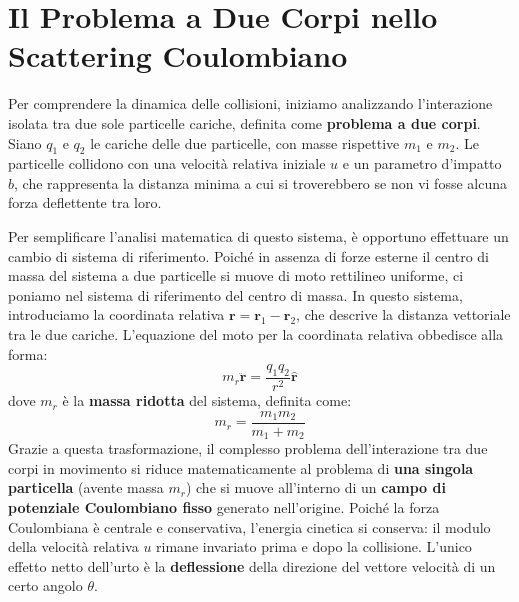 \section{Il Problema a Due Corpi nello Scattering Coulombiano}

Per comprendere la dinamica delle collisioni, iniziamo analizzando l'interazione isolata tra due sole particelle cariche, definita come \textbf{problema a due corpi}. Siano $q_1$ e $q_2$ le cariche delle due particelle, con masse rispettive $m_1$ e $m_2$. Le particelle collidono con una velocità relativa iniziale $u$ e un parametro d'impatto $b$, che rappresenta la distanza minima a cui si troverebbero se non vi fosse alcuna forza deflettente tra loro.

Per semplificare l'analisi matematica di questo sistema, è opportuno effettuare un cambio di sistema di riferimento. Poiché in assenza di forze esterne il centro di massa del sistema a due particelle si muove di moto rettilineo uniforme, ci poniamo nel sistema di riferimento del centro di massa. In questo sistema, introduciamo la coordinata relativa $\mathbf{r} = \mathbf{r}_1 - \mathbf{r}_2$, che descrive la distanza vettoriale tra le due cariche.
L'equazione del moto per la coordinata relativa obbedisce alla forma:
\begin{equation}
m_r \ddot{\mathbf{r}} = \frac{q_1 q_2}{r^2} \hat{\mathbf{r}}
\end{equation}
dove $m_r$ è la \textbf{massa ridotta} del sistema, definita come:
\begin{equation}
m_r = \frac{m_1 m_2}{m_1 + m_2}
\end{equation}
Grazie a questa trasformazione, il complesso problema dell'interazione tra due corpi in movimento si riduce matematicamente al problema di \textbf{una singola particella} (avente massa $m_r$) che si muove all'interno di un \textbf{campo di potenziale Coulombiano fisso} generato nell'origine. Poiché la forza Coulombiana è centrale e conservativa, l'energia cinetica si conserva: il modulo della velocità relativa $u$ rimane invariato prima e dopo la collisione. L'unico effetto netto dell'urto è la \textbf{deflessione} della direzione del vettore velocità di un certo angolo $\theta$.

